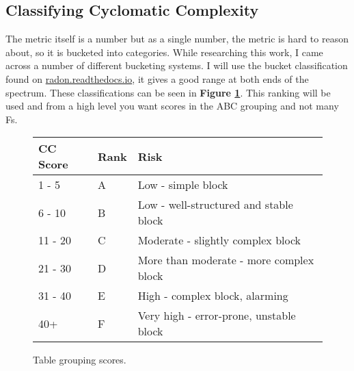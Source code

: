 \subsection{Classifying Cyclomatic Complexity}
The metric itself is a number but as a single number, the metric is hard to reason about, so it is bucketed into categories.
While researching this work, I came across a number of different bucketing systems.
I will use the bucket classification found on \href{https://radon.readthedocs.io}{radon.readthedocs.io}, it gives a good range at both ends of the spectrum.
These classifications can be seen in \textbf{Figure \ref{fig:cc_scores}}.
This ranking will be used and from a high level you want scores in the ABC grouping and not many Fs.
\begin{figure}

	\begin{center}
		\begin{tabular}{|l|l|l|}
			\hline
			\textbf{CC Score} & \textbf{Rank} & \textbf{Risk}                           \\
			\hline
			1 - 5             & A             & Low - simple block                      \\
			\hline
			6 - 10            & B             & Low - well-structured and stable block  \\
			\hline
			11 - 20           & C             & Moderate - slightly complex block       \\
			\hline
			21 - 30           & D             & More than moderate - more complex block \\
			\hline
			31 - 40           & E             & High - complex block, alarming          \\
			\hline
			40+               & F             & Very high - error-prone, unstable block \\
			\hline
		\end{tabular}
	\end{center}
	\caption{Table grouping \cc scores.}
	\label{fig:cc_scores}
\end{figure}
